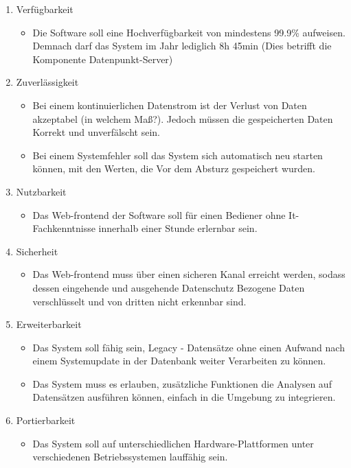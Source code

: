 \begin{enumerate}
    \item Verfügbarkeit
    \begin{itemize}
        \item Die Software soll eine Hochverfügbarkeit von mindestens 99.9\% aufweisen. Demnach darf das System im Jahr lediglich 8h 45min (Dies betrifft die Komponente Datenpunkt-Server)
    \end{itemize}
    \item Zuverlässigkeit
    \begin{itemize}
        \item Bei einem kontinuierlichen Datenstrom ist der Verlust von Daten akzeptabel (in welchem Maß?). Jedoch müssen die gespeicherten Daten Korrekt und unverfälscht sein.
        \item Bei einem Systemfehler soll das System sich automatisch neu starten können, mit den Werten, die Vor dem Absturz gespeichert wurden.
    \end{itemize}
    \item Nutzbarkeit
    \begin{itemize}
        \item Das Web-frontend der Software soll für einen Bediener ohne It-Fachkenntnisse innerhalb einer Stunde erlernbar sein. 
    \end{itemize}
    \item Sicherheit
    \begin{itemize}
        \item Das Web-frontend muss über einen sicheren Kanal erreicht werden, sodass dessen eingehende und ausgehende Datenschutz Bezogene Daten verschlüsselt und von dritten nicht erkennbar sind. 
    \end{itemize}
    \item Erweiterbarkeit
    \begin{itemize}
        \item Das System soll fähig sein, Legacy - Datensätze ohne einen Aufwand nach einem Systemupdate in der Datenbank weiter Verarbeiten zu können.
        \item Das System muss es erlauben, zusätzliche Funktionen die Analysen auf Datensätzen ausführen können, einfach in die Umgebung zu integrieren.  
    \end{itemize}
    \item Portierbarkeit
    \begin{itemize}
        \item Das System soll auf unterschiedlichen Hardware-Plattformen unter verschiedenen Betriebssystemen lauffähig sein.

\end{itemize}
\end{enumerate}

